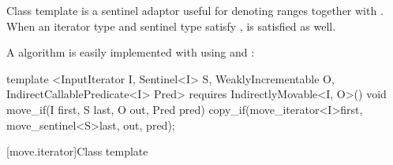 \begin{addedblock}
{\color{newclr}
\pnum
Class template  is a sentinel adaptor useful for denoting
ranges together with . When an iterator type  and
sentinel type  satisfy ,
 is satisfied as well.

\pnum
\enterexample A  algorithm is easily implemented with
 using  and :

\begin{codeblock}
template <InputIterator I, Sentinel<I> S, WeaklyIncrementable O,
          IndirectCallablePredicate<I> Pred>
  requires IndirectlyMovable<I, O>()
void move_if(I first, S last, O out, Pred pred)
{
  copy_if(move_iterator<I>{first}, move_sentinel<S>{last}, out, pred);
}
\end{codeblock}

\exitexample
} %
\end{addedblock}

[move.iterator]{Class template }

